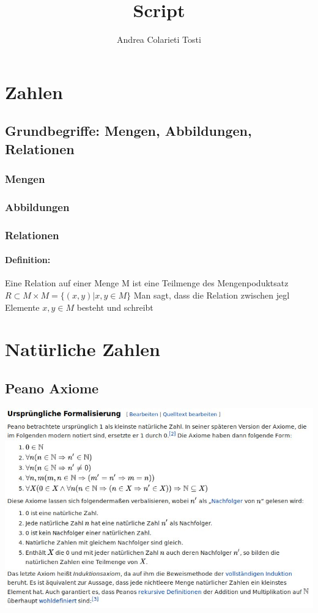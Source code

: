 \documentclass[14pt,a4paper]{article}
\author{Andrea Colarieti Tosti}
\title{Script}
\begin{document}
\section{Zahlen}
\subsection{Grundbegriffe: Mengen, Abbildungen, Relationen}
\subsubsection{Mengen}
\subsubsection{Abbildungen}
\subsubsection{Relationen}
\paragraph{Definition:} Eine Relation auf einer Menge M ist eine Teilmenge des Mengenpoduktsatz\\ $ R \subset M\times M= \{(x,y) | x,y \in M \}$ Man sagt, dass die Relation zwischen jegl Elemente $x,y \in M$ besteht und schreibt 
\section{Natürliche Zahlen}
\subsection{Peano Axiome}
\includegraphics[scale=0.7]{vorlagen/peano.jpg} 
\end{document}
